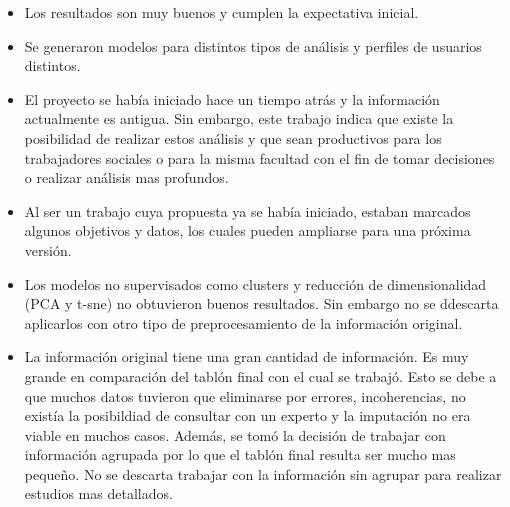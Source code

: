 \begin{itemize}
	\item 
	Los resultados son muy buenos y cumplen la expectativa inicial.
	\item 
	Se generaron modelos para distintos tipos de análisis y perfiles de usuarios distintos.
	\item 
	El proyecto se había iniciado hace un tiempo atrás y la información actualmente es antigua. Sin embargo, este trabajo indica que existe la posibilidad de realizar estos análisis y que sean productivos para los trabajadores sociales o para la misma facultad con el fin de tomar decisiones o realizar análisis mas profundos.
	\item 
	Al ser un trabajo cuya propuesta ya se había iniciado, estaban marcados algunos objetivos y datos, los cuales pueden ampliarse para una próxima versión.
	\item 
	Los modelos no supervisados como clusters y reducción de dimensionalidad (PCA y t-sne) no obtuvieron buenos resultados. Sin embargo no se ddescarta aplicarlos con otro tipo de preprocesamiento de la información original.
	\item 
	La información original tiene una gran cantidad de información. Es muy grande en comparación del tablón final con el cual se trabajó. Esto se debe a que muchos datos tuvieron que eliminarse por errores, incoherencias, no existía la posibildiad de consultar con un experto y la imputación no era viable en muchos casos. Además, se tomó la decisión de trabajar con información agrupada por lo que el tablón final resulta ser mucho mas pequeño. No se descarta trabajar con la información sin agrupar para realizar estudios mas detallados.
\end{itemize}

